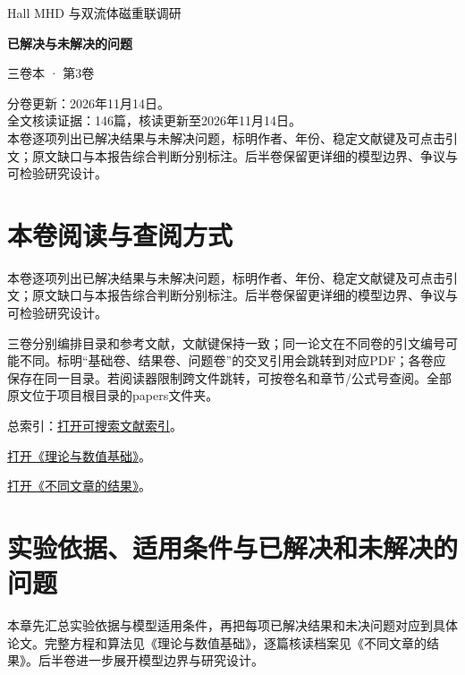 \documentclass[UTF8,a4paper,11pt,openany,fontset=fandol]{ctexbook}
\begin{document}
\frontmatter\begin{titlepage}\vspace*{22mm}
{\sffamily\Large Hall MHD 与双流体磁重联调研\par}\vspace{14mm}
{\sffamily\Huge\bfseries\color{ink}已解决与未解决的问题\par}\vspace{10mm}
{\sffamily\large 三卷本 · 第3卷\par}\vfill
分卷更新：2026年11月14日。\\[5pt]
全文核读证据：146篇，核读更新至2026年11月14日。\\[5pt]
本卷逐项列出已解决结果与未解决问题，标明作者、年份、稳定文献键及可点击引文；原文缺口与本报告综合判断分别标注。后半卷保留更详细的模型边界、争议与可检验研究设计。
\end{titlepage}\chapter*{本卷阅读与查阅方式}
本卷逐项列出已解决结果与未解决问题，标明作者、年份、稳定文献键及可点击引文；原文缺口与本报告综合判断分别标注。后半卷保留更详细的模型边界、争议与可检验研究设计。

三卷分别编排目录和参考文献，文献键保持一致；同一论文在不同卷的引文编号可能不同。标明“基础卷、结果卷、问题卷”的交叉引用会跳转到对应PDF；各卷应保存在同一目录。若阅读器限制跨文件跳转，可按卷名和章节/公式号查阅。全部原文位于项目根目录的papers文件夹。

总索引：\href{run:../paper_index.html}{打开可搜索文献索引}。
\par\href{run:01_theory_numerics.pdf}{打开《理论与数值基础》}。
\par\href{run:02_paper_results.pdf}{打开《不同文章的结果》}。
\tableofcontents\mainmatter
\chapter{实验依据、适用条件与已解决和未解决的问题}\label{ch:summary}
本章先汇总实验依据与模型适用条件，再把每项已解决结果和未决问题对应到具体论文。完整方程和算法见《理论与数值基础》，逐篇核读档案见《不同文章的结果》。后半卷进一步展开模型边界与研究设计。
\end{document}
